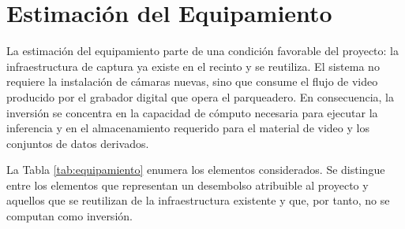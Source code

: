 \section{Estimación del Equipamiento}

La estimación del equipamiento parte de una condición favorable del proyecto: la
infraestructura de captura ya existe en el recinto y se reutiliza. El sistema no
requiere la instalación de cámaras nuevas, sino que consume el flujo de video
producido por el grabador digital que opera el parqueadero. En consecuencia, la
inversión se concentra en la capacidad de cómputo necesaria para ejecutar la
inferencia y en el almacenamiento requerido para el material de video y los
conjuntos de datos derivados.

La Tabla \ref{tab:equipamiento} enumera los elementos considerados. Se distingue
entre los elementos que representan un desembolso atribuible al proyecto y
aquellos que se reutilizan de la infraestructura existente y que, por tanto, no
se computan como inversión.

